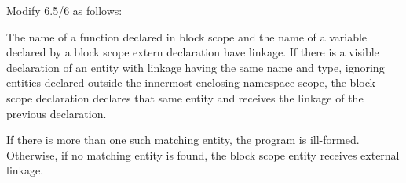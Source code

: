 \noindent
Modify 6.5/6 as follows:
\begin{std.txt}
\resetalinea[5]
\alinea
The name of a function declared in block scope and the name of a
variable declared by a block scope extern declaration have linkage.
If there is a visible declaration of an entity with linkage having the
same name and type, ignoring entities declared outside the innermost
enclosing namespace scope, the block scope declaration declares that
same entity and receives the linkage of the previous declaration. 
\begin{before}
\end{before}
If
there is more than one such matching entity, the program is
ill-formed. Otherwise, if no matching entity is found, the block scope
entity receives external linkage.
\begin{after}
\end{after}
\end{std.txt}

